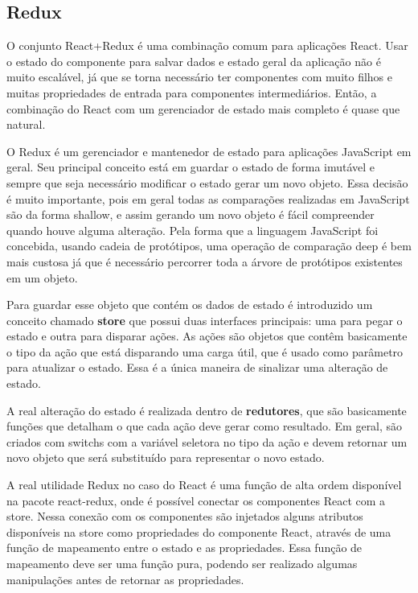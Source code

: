 \documentclass[rel_mlp]{iiufrgs}
\begin{document}
\subsection{Redux}
O conjunto React+Redux é uma combinação comum para aplicações React. Usar o estado do componente para salvar dados e estado geral da aplicação não é muito escalável, já que se torna necessário ter componentes com muito filhos e muitas propriedades de entrada para componentes intermediários. Então, a combinação do React com um gerenciador de estado mais completo é quase que natural. \par
O Redux é um gerenciador e mantenedor de estado para aplicações JavaScript em geral. Seu principal conceito está em guardar o estado de forma imutável e sempre que seja necessário modificar o estado gerar um novo objeto. Essa decisão é muito importante, pois em geral todas as comparações realizadas em JavaScript são da forma shallow, e assim gerando um novo objeto é fácil compreender quando houve alguma alteração. Pela forma que a linguagem JavaScript foi concebida, usando cadeia de protótipos, uma operação de comparação deep é bem mais custosa já que é necessário percorrer toda a árvore de protótipos existentes em um objeto. \par
Para guardar esse objeto que contém os dados de estado é introduzido um conceito chamado \textbf{store} que possui duas interfaces principais: uma para pegar o estado e outra para disparar ações. As ações são objetos que contêm basicamente o tipo da ação que está disparando uma carga útil, que é usado como parâmetro para atualizar o estado. Essa é a única maneira de sinalizar uma alteração de estado. \par
A real alteração do estado é realizada dentro de \textbf{redutores}, que são basicamente funções que detalham o que cada ação deve gerar como resultado. Em geral, são criados com switchs com a variável seletora no tipo da ação e devem retornar um novo objeto que será substituído para representar o novo estado.\par
A real utilidade Redux no caso do React é uma função de alta ordem disponível na pacote react-redux, onde é possível conectar os componentes React com a store. Nessa conexão com os componentes são injetados alguns atributos disponíveis na store como propriedades do componente React, através de uma função de mapeamento entre o estado e as propriedades. Essa função de mapeamento deve ser uma função pura, podendo ser realizado algumas manipulações antes de retornar as propriedades.
\end{document}
